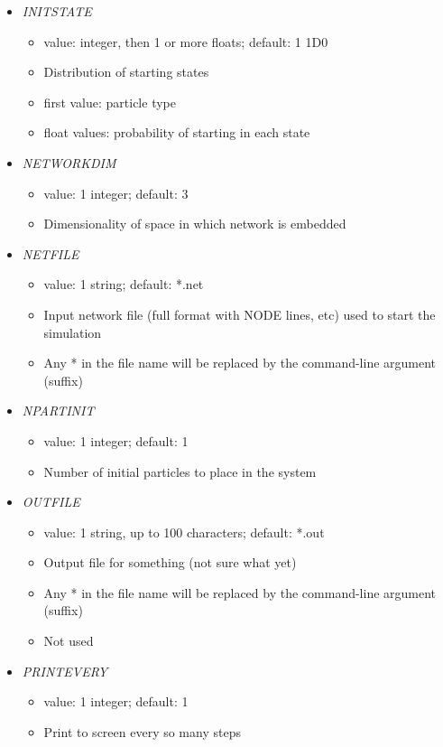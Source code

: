 \documentclass[12pt]{article}
\begin{document}
\begin{itemize}
%
\item {\it INITSTATE}
\begin{itemize}
	\item value: integer, then 1 or more floats; default: 1 1D0
	\item Distribution of starting states
	\item first value: particle type
	\item float values: probability of starting in each state
\end{itemize}
\item {\it NETWORKDIM}
	\begin{itemize}
		\item  value: 1 integer; default: 3
		\item Dimensionality of space in which network is embedded
	\end{itemize}
%
\item {\it NETFILE}
\begin{itemize}
	\item  value: 1 string; default: *.net
	\item Input network file (full format with NODE lines, etc) used to start the simulation
	 \item Any * in the file name will be replaced by the command-line argument (suffix)
\end{itemize}
%
\item {\it NPARTINIT}
\begin{itemize}
	\item  value: 1 integer; default: 1
	\item Number of initial particles to place in the system
\end{itemize}
%
\item {\it OUTFILE}
    \begin{itemize}
      \item  value: 1 string, up to 100 characters; default: *.out
      \item Output file for {\color{red} something} (not sure what yet)
      \item Any * in the file name will be replaced by the command-line argument (suffix)
      \item Not used
      \end{itemize}
%
\item {\it PRINTEVERY}
\begin{itemize}
	\item  value: 1 integer; default: 1
	\item Print to screen every so many steps

\end{itemize}
\end{itemize}
\end{document}
